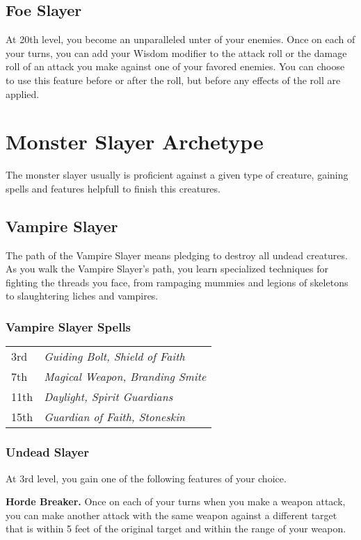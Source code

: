 \documentclass[11pt,a4paper,twocolumn]{article}
\newcommand{\sectiontitle}{}
\newcommand{\archetype}[1]
{
	\subsection*{#1}
	\renewcommand{\sectiontitle}{#1}
}
\newenvironment{archetypespells}
{
	\subsubsection*{\sectiontitle{} Spells}
	\begin{tabular}{ll}
}
{\end{tabular}}
\begin{document}
	\subsection*{Foe Slayer}
	At 20th level, you become an unparalleled unter of your enemies. Once on each of your turns, you can add your Wisdom modifier to the attack roll or the damage roll of an attack you make against one of your favored enemies. You can choose to use this feature before or after the roll, but before any effects of the roll are	applied.
	
	\section*{Monster Slayer Archetype}
	The monster slayer usually is proficient against a given type of creature, gaining spells and features helpfull to finish this creatures.
	
	\archetype{Vampire Slayer}
	The path of the Vampire Slayer means pledging to destroy all undead creatures. As you walk the Vampire Slayer's path, you learn specialized techniques for fighting the threads you face, from rampaging mummies and legions of skeletons to slaughtering liches and vampires.
	
	\begin{archetypespells}
		3rd & \textit{Guiding Bolt, Shield of Faith} \\
		7th & \textit{Magical Weapon, Branding Smite} \\
		11th & \textit{Daylight, Spirit Guardians} \\
		15th & \textit{Guardian of Faith, Stoneskin} \\
	\end{archetypespells}

	\subsubsection*{Undead Slayer}
	At 3rd level, you gain one of the following features of your choice.
	
	\textbf{Horde Breaker.} Once on each of your turns when you make a weapon attack, you can make another attack with the same weapon against a different target that is within 5 feet of the original target and within the range of your weapon.
	
\end{document}
